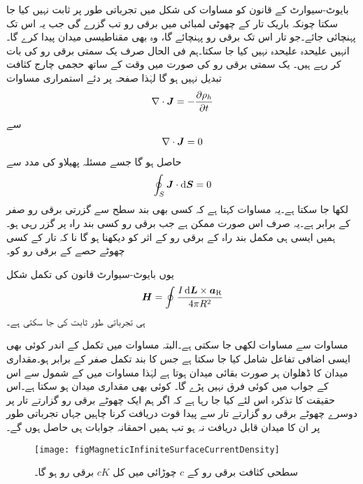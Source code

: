 بایوٹ-سیوارٹ کے قانون کو مساوات  کی شکل میں تجرباتی طور پر ثابت نہیں کیا جا سکتا چونکہ باریک تار کے چھوٹی لمبائی میں برقی رو تب گزرے گی جب یہ اس تک پہنچائی جائے۔جو تار اس تک برقی رو پہنچائے گا، وہ بھی مقناطیسی میدان پیدا کرے گا۔انہیں علیحدہ علیحدہ نہیں کیا جا سکتا۔ہم فی الحال صرف یک سمتی برقی رو کی بات کر رہے ہیں۔ یک سمتی برقی رو کی صورت میں وقت کے ساتھ حجمی چارج کثافت تبدیل نہیں ہو گا لہٰذا صفحہ  پر دئے  استمراری مساوات
\begin{align*}
\nabla \cdot {\ensuremath{{\boldsymbol{J}}}}=-\frac{\partial \rho_h}{\partial t}
\end{align*}
سے
\begin{align}\label{مساوات_مقناطیسی_صرف_مکمل_بند_راہ}
\nabla \cdot {\ensuremath{{\boldsymbol{J}}}}=0
\end{align}
حاصل ہو گا جسے مسئلہ پھیلاو کی مدد سے
\begin{align*}
\oint_S  \kvec{J} \cdot \dif \kvec{S}=0
\end{align*}
لکھا جا سکتا ہے۔یہ مساوات کہتا ہے کہ کسی بھی بند سطح سے گزرتی برقی رو صفر کے برابر ہے۔یہ صرف اس صورت ممکن ہے جب برقی رو کسی بند راہ پر گزر رہی ہو۔ہمیں ایسی ہی مکمل بند راہ کے برقی رو کے اثر کو دیکھنا ہو گا نا کہ تار کے کسی چھوٹے حصے  کے برقی رو کو۔ 

یوں بایوٹ-سیوارٹ قانون کی تکمل شکل
\begin{align}\label{مساوات_بایوٹ_سیوارٹ_تکمل_شکل}
\kvec{H}=\oint \frac{I \dif \kvec{L} \times \aR}{4 \pi R^2}
\end{align}
ہی تجرباتی طور ثابت کی جا سکتی ہے۔

مساوات  سے مساوات  لکھی جا سکتی ہے۔البتہ مساوات  میں تکمل کے اندر کوئی بھی ایسی اضافی تفاعل شامل کیا جا سکتا ہے جس کا بند تکمل صفر کے برابر ہو۔مقداری میدان کا ڈھلوان ہر صورت بقائی میدان ہوتا ہے لہٰذا مساوات  میں  کے شمول سے اس کے جواب میں کوئی فرق نہیں پڑے گا۔ کوئی بھی مقداری میدان ہو سکتا ہے۔اس حقیقت کا تذکرہ اس لئے کیا جا رہا ہے کہ اگر ہم ایک چھوٹے برقی رو گزارتے تار پر دوسرے  چھوٹے برقی رو گزارتے تار سے پیدا قوت دریافت کرنا چاہیں جہاں تجرباتی طور پر ان کا میدان قابل دریافت نہ ہو تب ہمیں احمقانہ جوابات ہی حاصل ہوں گے۔

\begin{figure}
\centering
\texttt{[image: figMagneticInfiniteSurfaceCurrentDensity]}
\caption{سطحی کثافت برقی رو کے $c$ چوڑائی میں کل $cK$ برقی رو ہو گا۔}
\label{شکل_مقناطیسی_سطحی_کثافت_برقی_رو_اور_رو}
\end{figure}

